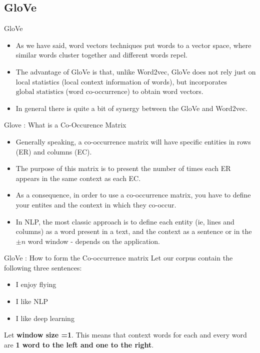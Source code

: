 \documentclass[11pt]{beamer}
\newcommand{\highlight}[1]{%
  \colorbox{yellow!100}{$\displaystyle#1$}}
\begin{document}
\subsection{GloVe	 \\ \scalebox{0.8}{Global Vectors for Word Representation}}
\begin{frame}{GloVe}
	\begin{itemize}
		\item As we have said, word vectors techniques put words to a vector space, where similar words cluster together and different words repel. 
		\item The advantage of GloVe is that, unlike Word2vec, GloVe does not rely just on local statistics (local context information of words), but incorporates \highlight{\text{global statistics}} (word co-occurrence) to obtain word vectors. 
		\item In general there is quite a bit of synergy between the GloVe and Word2vec.
	\end{itemize}
\end{frame}
\begin{frame}{Glove : What is a Co-Occurence Matrix}
	\begin{itemize}
		\item Generally speaking, a co-occurrence matrix will have specific entities in rows (ER) and columns (EC). 
		\item The purpose of this matrix is to present the number of times each ER appears in the same context as each EC. 
		\item As a consequence, in order to use a co-occurrence matrix, you have to define your entites and the context in which they co-occur.
		\item In NLP, the most classic approach is to define each entity (ie, lines and columns) as a word present in a text, and the context as a sentence or in the $\pm n$ word window - depends on the application.
	\end{itemize}
\end{frame}
\begin{frame}{GloVe : How to form the Co-occurrence matrix}
Let our corpus contain the following three sentences:
	\begin{itemize}
		\item I enjoy flying
		\item I like NLP
		\item I like deep learning
	\end{itemize}
Let \textbf{window size =1}. This means that context words for each and every word are \textbf{1 word to the left and one to the right}.
\end{frame}
\end{document}
